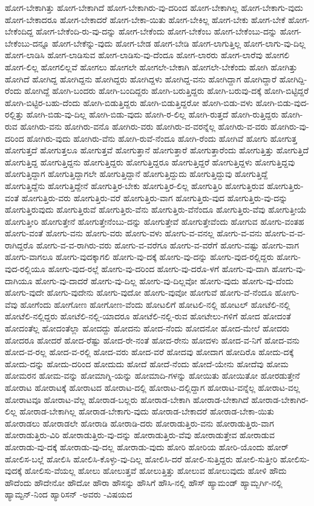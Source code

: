 {ಹೋಗ-ಬೇಕಾಗಿತ್ತು
ಹೋಗ-ಬೇಕಾಗಿದೆ
ಹೋಗ-ಬೇಕಾಗಿರು-ವು-ದರಿಂದ
ಹೋಗ-ಬೇಕಾಗಿಲ್ಲ
ಹೋಗ-ಬೇಕಾಗು-ವುದು
ಹೋಗ-ಬೇಕಾದರೂ
ಹೋಗ-ಬೇಕಾದರೆ
ಹೋಗ-ಬೇಕಾ-ಯಿತು
ಹೋಗ-ಬೇಕಿಲ್ಲ
ಹೋಗ-ಬೇಕು
ಹೋಗ-ಬೇಕೆ
ಹೋಗ-ಬೇಕೆಂದಿದ್ದ
ಹೋಗ-ಬೇಕೆಂದಿ-ರು-ವು-ದನ್ನು
ಹೋಗ-ಬೇಕೆಂದು
ಹೋಗ-ಬೇಕೆಂಬ
ಹೋಗ-ಬೇಕೆಂಬು-ದನ್ನು
ಹೋಗ-ಬೇಕೆಂಬು-ದನ್ನೂ
ಹೋಗ-ಬೇಕೆನ್ನು-ವುದು
ಹೋಗ-ಬೇಡ
ಹೋಗ-ಬೇಡಿ
ಹೋಗ-ಲಾಗುತ್ತಿಲ್ಲ
ಹೋಗ-ಲಾಗು-ವು-ದಿಲ್ಲ
ಹೋಗ-ಲಾಡಿಸಿ
ಹೋಗ-ಲಾಡಿಸುವ
ಹೋಗ-ಲಾಡಿಸು-ವು-ದೆಂದೂ
ಹೋಗ-ಲಾರರು
ಹೋಗ-ಲಾರೆವು
ಹೋಗಲಿ
ಹೋಗ-ಲಿಲ್ಲ
ಹೋಗಲಿಲ್ಲವೆ
ಹೋಗಲು
ಹೋಗಲೇ
ಹೋಗಲೇ-ಬೇಕಾಗಿ
ಹೋಗಲೇ-ಬೇಕೆಂದು
ಹೋಗಿ
ಹೋಗಿತ್ತು
ಹೋಗಿದೆ
ಹೋಗಿದ್ದ
ಹೋಗಿದ್ದನು
ಹೋಗಿದ್ದರು
ಹೋಗಿದ್ದಳು
ಹೋಗಿದ್ದ-ವನು
ಹೋಗಿದ್ದಾಗ
ಹೋಗಿದ್ದಾರೆ
ಹೋಗಿದ್ದಿ-ರೆಂದು
ಹೋಗಿದ್ದೆ
ಹೋಗಿ-ಬಂದರು
ಹೋಗಿ-ಬಂದಿದ್ದರು
ಹೋಗಿ-ಬರುತ್ತಿದ್ದರು
ಹೋಗಿ-ಬರುವು-ದಕ್ಕೆ
ಹೋಗಿ-ಬಿಟ್ಟಿದ್ದರೆ
ಹೋಗಿ-ಬಿಟ್ಟಿರ-ಬಹು-ದೆಂದು
ಹೋಗಿ-ಬಿಡುತ್ತಿದ್ದರು
ಹೋಗಿ-ಬಿಡುತ್ತಿದ್ದರೋ
ಹೋಗಿ-ಬಿಡು-ವಳು
ಹೋಗಿ-ಬಿಡು-ವುದ-ರಲ್ಲಿತ್ತು
ಹೋಗಿ-ಬಿಡು-ವು-ದಿಲ್ಲ
ಹೋಗಿ-ಬಿಡು-ವುದು
ಹೋಗಿ-ರ-ಲಿಲ್ಲ
ಹೋಗಿ-ರುತ್ತದೆ
ಹೋಗಿ-ರುತ್ತಿದ್ದರು
ಹೋಗಿ-ರುವ
ಹೋಗಿರು-ವನು
ಹೋಗಿರು-ವನೊ
ಹೋಗಿರು-ವರು
ಹೋಗಿರು-ವ-ವರನ್ನೆಲ್ಲ
ಹೋಗಿರು-ವ-ವರು
ಹೋಗಿರು-ವು-ದರಿಂದ
ಹೋಗಿರು-ವುದು
ಹೋಗಿರು-ವೆನು
ಹೋಗಿ-ರುವೆ-ನೆಂದೂ
ಹೋಗಿ-ರೆಂದು
ಹೋಗಿವೆ
ಹೋಗು
ಹೋಗುತ್ತ
ಹೋಗುತ್ತದೆ
ಹೋಗುತ್ತಲೂ
ಹೋಗುತ್ತವೆ
ಹೋಗುತ್ತಾನೆ
ಹೋಗುತ್ತಾರೆ
ಹೋಗುತ್ತಾರೆಂದು
ಹೋಗುತ್ತಿತ್ತು
ಹೋಗುತ್ತಿದೆ
ಹೋಗುತ್ತಿದ್ದ
ಹೋಗುತ್ತಿದ್ದನು
ಹೋಗುತ್ತಿದ್ದರು
ಹೋಗುತ್ತಿದ್ದರೂ
ಹೋಗುತ್ತಿದ್ದರೆ
ಹೋಗುತ್ತಿದ್ದಳು
ಹೋಗುತ್ತಿದ್ದವು
ಹೋಗುತ್ತಿದ್ದಾಗ
ಹೋಗುತ್ತಿದ್ದಾಗಲೇ
ಹೋಗುತ್ತಿದ್ದಾನೆ
ಹೋಗುತ್ತಿದ್ದುದು
ಹೋಗುತ್ತಿದ್ದುವು
ಹೋಗುತ್ತಿದ್ದೆ
ಹೋಗುತ್ತಿದ್ದೆನು
ಹೋಗುತ್ತಿದ್ದೇನೆ
ಹೋಗುತ್ತಿರ-ಬೇಕು
ಹೋಗುತ್ತಿರ-ಲಿಲ್ಲ
ಹೋಗುತ್ತಿರಿ
ಹೋಗುತ್ತಿರುವ
ಹೋಗುತ್ತಿರು-ವಂತೆ
ಹೋಗುತ್ತಿರು-ವರು
ಹೋಗುತ್ತಿರು-ವರೆ
ಹೋಗುತ್ತಿರು-ವಾಗ
ಹೋಗುತ್ತಿರು-ವುದ
ಹೋಗುತ್ತಿರು-ವು-ದನ್ನು
ಹೋಗುತ್ತಿರುವುದು
ಹೋಗುತ್ತಿರುವೆ
ಹೋಗುತ್ತಿರು-ವೆನು
ಹೋಗುತ್ತಿರು-ವೆನೆಂದೂ
ಹೋಗುತ್ತಿರು-ವೆವು
ಹೋಗುತ್ತೀಯೆ
ಹೋಗುತ್ತೀರಿ
ಹೋಗುತ್ತೇನೆ
ಹೋಗುತ್ತೇನೆಂಬು-ದನ್ನು
ಹೋಗುತ್ತೇವೆ
ಹೋಗುತ್ತೇವೆಂದು
ಹೋಗುವ
ಹೋಗು-ವಂತಹ
ಹೋಗು-ವಂತೆ
ಹೋಗು-ವನು
ಹೋಗು-ವರು
ಹೋಗು-ವಳು
ಹೋಗು-ವ-ವನಲ್ಲ
ಹೋಗು-ವ-ವನು
ಹೋಗು-ವ-ವ-ರಾಗಿದ್ದರೊ
ಹೋಗು-ವ-ವ-ರಾಗಿರು-ವರು
ಹೋಗು-ವ-ವರೆಗೂ
ಹೋಗು-ವ-ವರೆಗೆ
ಹೋಗು-ವಷ್ಟು
ಹೋಗು-ವಾಗ
ಹೋಗು-ವಾಗಲೂ
ಹೋಗು-ವುದಕ್ಕಾಗಲಿ
ಹೋಗು-ವು-ದಕ್ಕೆ
ಹೋಗು-ವು-ದನ್ನು
ಹೋಗು-ವುದ-ರಲ್ಲಿದ್ದರು
ಹೋಗು-ವುದ-ರಲ್ಲಿಯೂ
ಹೋಗು-ವುದ-ರಲ್ಲೆ
ಹೋಗು-ವು-ದರಿಂದ
ಹೋಗು-ವು-ದರೊ-ಳಗೆ
ಹೋಗು-ವು-ದಾಗಿ
ಹೋಗು-ವು-ದಾಗಿಯೂ
ಹೋಗು-ವು-ದಾದರೆ
ಹೋಗು-ವು-ದಿಲ್ಲ
ಹೋಗು-ವು-ದಿಲ್ಲವೋ
ಹೋಗು-ವುದು
ಹೋಗು-ವು-ದೆಂದು
ಹೋಗು-ವುದೇ
ಹೋಗು-ವುದೇನು
ಹೋಗು-ವುದೋ
ಹೋಗು-ವುವೋ
ಹೋಗುವೆ
ಹೋಗು-ವೆ-ನೆಂದೂ
ಹೋಗು-ವೆವು
ಹೋಗೆಂದು
ಹೋಗೋಣ
ಹೋಗೋಣ-ವೆಂದು
ಹೋಟಲಿಗೆ
ಹೋಟಲಿ-ನಲ್ಲಿ
ಹೋಟಲ್
ಹೋಟೆಲಿ-ನಲ್ಲಿ
ಹೋಟೆಲಿ-ನಲ್ಲಿದ್ದರು
ಹೋಟೆಲಿ-ನಲ್ಲಿ-ಯಾದರೂ
ಹೋಟೆಲಿ-ನಲ್ಲಿ-ರುವ
ಹೋಟೇಲು-ಗಳಿಗೆ
ಹೋದ
ಹೋದಂತೆ
ಹೋದಂತೆಲ್ಲ
ಹೋದಂತೆಲ್ಲಾ
ಹೋದದ್ದು
ಹೋದನು
ಹೋದ-ನೆಂದು
ಹೋದನೋ
ಹೋದ-ಮೇಲೆ
ಹೋದರು
ಹೋದರೂ
ಹೋದರೆ
ಹೋದ-ರೆಷ್ಟು
ಹೋದ-ರೇ-ನಂತೆ
ಹೋದ-ರೇನು
ಹೋದಳು
ಹೋದ-ವ-ನಿಗೆ
ಹೋದ-ವನು
ಹೋದ-ವ-ರಲ್ಲ
ಹೋದ-ವ-ರಲ್ಲಿ
ಹೋದ-ವರು
ಹೋದ-ವರೆ
ಹೋದವು
ಹೋದಾಗ
ಹೋದಿರೊ
ಹೋದು-ದಕ್ಕೆ
ಹೋದು-ದನ್ನು
ಹೋದು-ದರಿಂದ
ಹೋದುದು
ಹೋದೆ
ಹೋದೆ-ನೆಂದು
ಹೋದೆ-ಯೇನು
ಹೋದೆವು
ಹೋಮ
ಹೋಮರನ
ಹೋಮ-ವನ್ನು
ಹೋಮಾಗ್ನಿ-ಯನ್ನು
ಹೋಮಾದಿ-ಗಳನ್ನು
ಹೋಯಿತು
ಹೋಯಿತೋ
ಹೋರಡುತ್ತೇನೆ
ಹೋರಾಟ
ಹೋರಾಟಕ್ಕೆ
ಹೋರಾಟದ
ಹೋರಾಟ-ದಲ್ಲಿ
ಹೋರಾಟ-ದಲ್ಲಿದ್ದಾಗ
ಹೋರಾಟ-ವನ್ನೆಲ್ಲ
ಹೋರಾಟ-ವಲ್ಲ
ಹೋರಾಟವೂ
ಹೋರಾಟ-ವೆಲ್ಲ
ಹೋರಾಡ-ಬಲ್ಲರು
ಹೋರಾಡ-ಬೇಕಾಗಿ
ಹೋರಾಡ-ಬೇಕಾಗಿದೆ
ಹೋರಾಡ-ಬೇಕಾಗಿರ-ಲಿಲ್ಲ
ಹೋರಾಡ-ಬೇಕಾಗಿಲ್ಲ
ಹೋರಾಡ-ಬೇಕಾಗು-ವುದು
ಹೋರಾಡ-ಬೇಕಾದರೆ
ಹೋರಾಡ-ಬೇಕಾ-ಯಿತು
ಹೋರಾಡಲು
ಹೋರಾಡಲೇ
ಹೋರಾಡಿ
ಹೋರಾಡಿ-ದರು
ಹೋರಾಡುತ್ತಿರು-ವನು
ಹೋರಾಡುತ್ತಿರು-ವಾಗ
ಹೋರಾಡುತ್ತಿರು-ವಿರಿ
ಹೋರಾಡುತ್ತಿರು-ವು-ದನ್ನು
ಹೋರಾಡುತ್ತಿರು-ವೆವು
ಹೋರಾಡುತ್ತೇವ
ಹೋರಾಡುವ
ಹೋರಾಡು-ವು-ದಕ್ಕೆ
ಹೋರಾಡು-ವು-ದಲ್ಲ
ಹೋರಾಡು-ವುದು
ಹೋರಿ
ಹೋರಿಯ
ಹೋರಿ-ಯೊಂದು
ಹೋರ್
ಹೋಲಿಸ-ಬಲ್ಲೆ
ಹೋಲಿಸಿ
ಹೋಲಿಸಿ-ಕೊಳ್ಳು-ವು-ದಿಲ್ಲ
ಹೋಲಿಸಿ-ದರೆ
ಹೋಲಿ-ಸುತ್ತಿದ್ದರು
ಹೋಲಿ-ಸುತ್ತೀರಿ
ಹೋಲಿಸು-ವುದಕ್ಕೆ
ಹೋಲಿಸು-ವೆಯಲ್ಲ
ಹೋಲು
ಹೋಲುತ್ತವೆ
ಹೋಲುತ್ತಿತ್ತು
ಹೋಲುವ
ಹೋಲುವುದು
ಹೋಳಿ
ಹೌದು
ಹೌದೆಂದು
ಹೌದೇನೋ
ಹೌದೋ
ಹೌರಾ
ಹೌಸನ್ನು
ಹೌಸಿಗೆ
ಹೌಸಿ-ನಲ್ಲಿ
ಹೌಸ್
ಹ್ಯಾಮಂಡ್
ಹ್ಯಾಮ್ಬರ್ಗಿ-ನಲ್ಲಿ
ಹ್ಯಾಮ್ಟನ್-ನಿಂದ
ಹ್ಯಾರಿಸನ್
-ಅವರು
-ವಿಷಯದ
}
